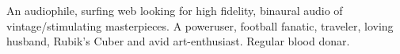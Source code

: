 

\begin{cvparagraph}

  An audiophile, surfing web looking for high fidelity, binaural audio of vintage/stimulating masterpieces.
  A poweruser, football fanatic, traveler, loving husband, Rubik's Cuber and avid art-enthusiast.
  Regular blood donar.
\end{cvparagraph}  
